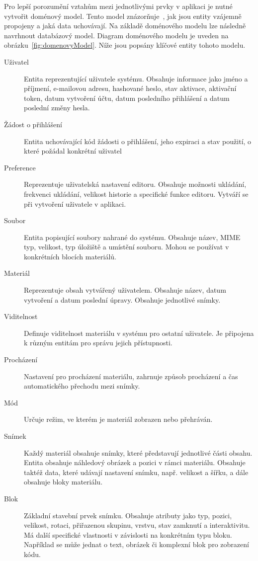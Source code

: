 Pro lepší porozumění vztahům mezi jednotlivými prvky v aplikaci je nutné vytvořit doménový model. Tento model znázorňuje~\cite{uml_2007}, jak jsou entity vzájemně propojeny a jaká data uchovávají. Na základě doménového modelu lze následně navrhnout databázový model. Diagram doménového modelu je uveden na obrázku~\ref{fig:domenovyModel}. Níže jsou popsány klíčové entity tohoto modelu.

\begin{description}
    \item[Uživatel] 
    Entita reprezentující uživatele systému. Obsahuje informace jako jméno a příjmení, e-mailovou adresu, hashované heslo, stav aktivace, aktivační token, datum vytvoření účtu, datum posledního přihlášení a datum poslední změny hesla.

    \item[Žádost o přihlášení] 
    Entita uchovávající kód žádosti o přihlášení, jeho expiraci a stav použití, o které požádal konkrétní uživatel
    
    \item[Preference] 
    Reprezentuje uživatelská nastavení editoru. Obsahuje možnosti ukládání, frekvenci ukládání, velikost historie a specifické funkce editoru. Vytváří se při vytvoření uživatele v aplikaci.

    \item[Soubor] 
    Entita popisující soubory nahrané do systému. Obsahuje název, MIME typ, velikost, typ úložiště a umístění souboru. Mohou se používat v konkrétních blocích materiálů.
    
    \item[Materiál] 
    Reprezentuje obsah vytvářený uživatelem. Obsahuje název, datum vytvoření a datum poslední úpravy. Obsahuje jednotlivé snímky.
    
    \item[Viditelnost] 
    Definuje viditelnost materiálu v systému pro ostatní uživatele. Je připojena k různým entitám pro správu jejich přístupnosti.
        
    \item[Procházení] 
    Nastavení pro procházení materiálu, zahrnuje způsob procházení a čas automatického přechodu mezi snímky.
    
    \item[Mód] 
    Určuje režim, ve kterém je materiál zobrazen nebo přehráván.
    
    \item[Snímek] 
    Každý materiál obsahuje snímky, které představují jednotlivé části obsahu. Entita obsahuje náhledový obrázek a pozici v rámci materiálu. Obsahuje taktéž data, které udávají nastavení snímku, např. velikost a šířku, a dále obsahuje bloky materiálu.
    
    \item[Blok] 
    Základní stavební prvek snímku. Obsahuje atributy jako typ, pozici, velikost, rotaci, přiřazenou skupinu, vrstvu, stav zamknutí a interaktivitu. Má další specifické vlastnosti v závislosti na konkrétním typu bloku. Například se může jednat o text, obrázek či komplexní blok pro zobrazení kódu.
\end{description}

